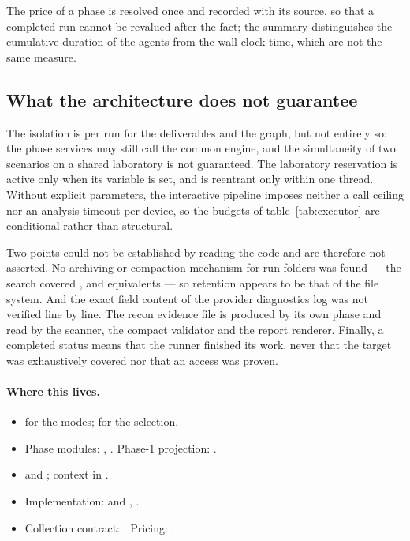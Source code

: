 The price of a phase is resolved once and recorded with its source, so that a
completed run cannot be revalued after the fact; the summary distinguishes the
cumulative duration of the agents from the wall-clock time, which are not the same
measure.

\subsection{What the architecture does not guarantee}

The isolation is per run for the deliverables and the graph, but not entirely so:
the phase services may still call the common engine, and the simultaneity of two
scenarios on a shared laboratory is not guaranteed. The laboratory reservation is
active only when its variable is set, and is reentrant only within one thread.
Without explicit parameters, the interactive pipeline imposes neither a call
ceiling nor an analysis timeout per device, so the budgets of
table~\ref{tab:executor} are conditional rather than structural.

Two points could not be established by reading the code and are therefore not
asserted. No archiving or compaction mechanism for run folders was found --- the
search covered ,  and equivalents --- so
retention appears to be that of the file system. And the exact field content of
the provider diagnostics log was not verified line by line. The recon evidence
file is produced by its own phase and read by the scanner, the compact validator
and the report renderer. Finally, a completed
status means that the runner finished its work, never that the target was
exhaustively covered nor that an access was proven.

\paragraph{Where this lives.}
\begin{itemize}
\item {} for the modes;  for the selection.
\item Phase modules: , . Phase-1 projection: .
\item {} and ; context in .
\item Implementation:  and , .
\item Collection contract: . Pricing: .
\end{itemize}
